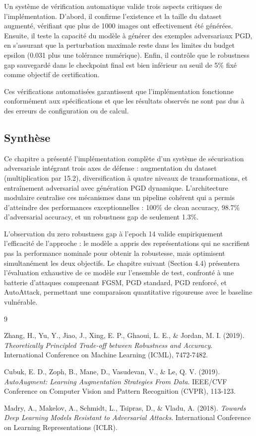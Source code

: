 Un système de vérification automatique valide trois aspects critiques de l'implémentation. D'abord, il confirme l'existence et la taille du dataset augmenté, vérifiant que plus de 1000 images ont effectivement été générées. Ensuite, il teste la capacité du modèle à générer des exemples adversariaux PGD, en s'assurant que la perturbation maximale reste dans les limites du budget epsilon (0.031 plus une tolérance numérique). Enfin, il contrôle que le robustness gap sauvegardé dans le checkpoint final est bien inférieur au seuil de 5\% fixé comme objectif de certification.

Ces vérifications automatisées garantissent que l'implémentation fonctionne conformément aux spécifications et que les résultats observés ne sont pas dus à des erreurs de configuration ou de calcul.

\subsection*{Synthèse}

Ce chapitre a présenté l'implémentation complète d'un système de sécurisation adversariale intégrant trois axes de défense : augmentation du dataset (multiplication par 15.2), diversification à quatre niveaux de transformations, et entraînement adversarial avec génération PGD dynamique. L'architecture modulaire centralise ces mécanismes dans un pipeline cohérent qui a permis d'atteindre des performances exceptionnelles : 100\% de clean accuracy, 98.7\% d'adversarial accuracy, et un robustness gap de seulement 1.3\%.

L'observation du zero robustness gap à l'epoch 14 valide empiriquement l'efficacité de l'approche : le modèle a appris des représentations qui ne sacrifient pas la performance nominale pour obtenir la robustesse, mais optimisent simultanément les deux objectifs. Le chapitre suivant (Section 4.4) présentera l'évaluation exhaustive de ce modèle sur l'ensemble de test, confronté à une batterie d'attaques comprenant FGSM, PGD standard, PGD renforcé, et AutoAttack, permettant une comparaison quantitative rigoureuse avec le baseline vulnérable.

\begin{thebibliography}{9}

Zhang, H., Yu, Y., Jiao, J., Xing, E. P., Ghaoui, L. E., \& Jordan, M. I. (2019). \textit{Theoretically Principled Trade-off between Robustness and Accuracy}. International Conference on Machine Learning (ICML), 7472-7482.

Cubuk, E. D., Zoph, B., Mane, D., Vasudevan, V., \& Le, Q. V. (2019). \textit{AutoAugment: Learning Augmentation Strategies From Data}. IEEE/CVF Conference on Computer Vision and Pattern Recognition (CVPR), 113-123.

Madry, A., Makelov, A., Schmidt, L., Tsipras, D., \& Vladu, A. (2018). \textit{Towards Deep Learning Models Resistant to Adversarial Attacks}. International Conference on Learning Representations (ICLR).

\end{thebibliography}
